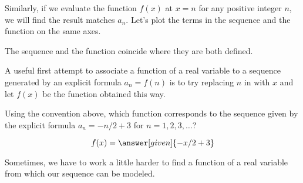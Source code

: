 \documentclass{ximera}
\begin{document}
Similarly, if we evaluate the function $f(x)$ at $x=n$ for any positive integer $n$, we will find the result matches $a_n$.  Let's plot the terms in the sequence and the function on the same axes.

\begin{image}
\end{image}

The sequence and the function coincide where they are both defined.  

A useful first attempt to associate a function of a real variable to a sequence generated by an explicit formula $a_n=f(n)$ is to try replacing $n$ in  with $x$ and let $f(x)$ be the function obtained this way.

\begin{question}
  Using the convention above, which function corresponds to the sequence given by the explicit formula
  $a_n = -n/2+3$ for $n=1,2,3,\dots$?
  \begin{prompt}
    \[
    f(x) = \answer[given]{-x/2 + 3}
    \]
  \end{prompt}
\end{question}

Sometimes, we have to work a little harder to find a function of a real variable from which our sequence can be modeled.  
\end{document}
